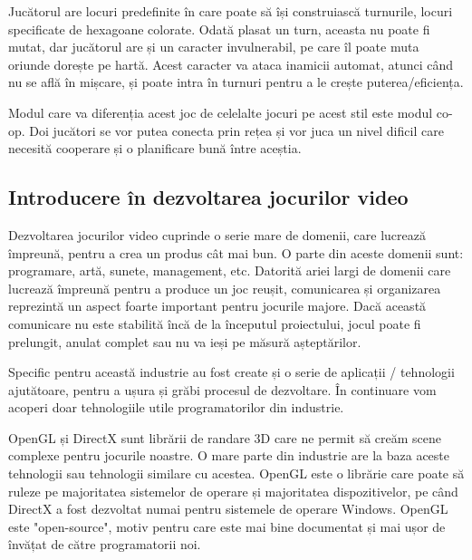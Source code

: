\documentclass[12pt, a4paper]{article}
\begin{document}
	Jucătorul are locuri predefinite în care poate să își construiască turnurile, locuri specificate de hexagoane colorate. Odată plasat un turn, aceasta nu poate fi mutat, dar jucătorul are și un caracter invulnerabil, pe care îl poate muta oriunde dorește pe hartă. Acest caracter va ataca inamicii automat, atunci când nu se află în mișcare, și poate intra în turnuri pentru a le crește puterea/eficiența.
	\newline
	
	Modul care va diferenția acest joc de celelalte jocuri pe acest stil este modul co-op. Doi jucători se vor putea conecta prin rețea și vor juca un nivel dificil care necesită cooperare și o planificare bună între aceștia.
	
	
	
	
	
	\subsection{Introducere în dezvoltarea jocurilor video}
	
	Dezvoltarea jocurilor video cuprinde o serie mare de domenii, care lucrează împreună, pentru a crea un produs cât mai bun. O parte din aceste domenii sunt: programare, artă, sunete, management, etc. Datorită ariei largi de domenii care lucrează împreună pentru a produce un joc reușit, comunicarea și organizarea reprezintă un aspect foarte important pentru jocurile majore. Dacă această comunicare nu este stabilită încă de la începutul proiectului, jocul poate fi prelungit, anulat complet sau nu va ieși pe măsură așteptărilor.
	\newline
	
	Specific pentru această industrie au fost create și o serie de aplicații / tehnologii ajutătoare, pentru a ușura și grăbi procesul de dezvoltare. În continuare vom acoperi doar tehnologiile utile programatorilor din industrie.
	\newline
	
	OpenGL și DirectX sunt librării de randare 3D care ne permit să creăm scene complexe pentru jocurile noastre. O mare parte din industrie are la baza aceste tehnologii sau tehnologii similare cu acestea. OpenGL este o librărie care poate să ruleze pe majoritatea sistemelor de operare și majoritatea dispozitivelor, pe când DirectX a fost dezvoltat numai pentru sistemele de operare Windows. OpenGL este "open-source", motiv pentru care este mai bine documentat și mai ușor de învățat de către programatorii noi.
	\newline
	
\end{document}

